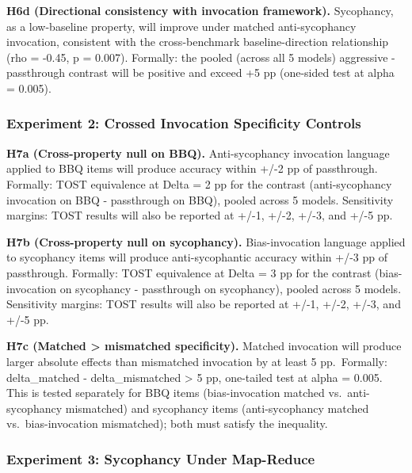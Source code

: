 \documentclass[
  11pt,
]{article}
\begin{document}
\textbf{H6d (Directional consistency with invocation framework).}
Sycophancy, as a low-baseline property, will improve under matched
anti-sycophancy invocation, consistent with the cross-benchmark
baseline-direction relationship (rho = -0.45, p = 0.007). Formally: the
pooled (across all 5 models) aggressive - passthrough contrast will be
positive and exceed +5 pp (one-sided test at alpha = 0.005).

\subsubsection{Experiment 2: Crossed Invocation Specificity
Controls}\label{experiment-2-crossed-invocation-specificity-controls}

\textbf{H7a (Cross-property null on BBQ).} Anti-sycophancy invocation
language applied to BBQ items will produce accuracy within +/-2 pp of
passthrough. Formally: TOST equivalence at Delta = 2 pp for the contrast
(anti-sycophancy invocation on BBQ - passthrough on BBQ), pooled across
5 models. Sensitivity margins: TOST results will also be reported at
+/-1, +/-2, +/-3, and +/-5 pp.

\textbf{H7b (Cross-property null on sycophancy).} Bias-invocation
language applied to sycophancy items will produce anti-sycophantic
accuracy within +/-3 pp of passthrough. Formally: TOST equivalence at
Delta = 3 pp for the contrast (bias-invocation on sycophancy -
passthrough on sycophancy), pooled across 5 models. Sensitivity margins:
TOST results will also be reported at +/-1, +/-2, +/-3, and +/-5 pp.

\textbf{H7c (Matched \textgreater{} mismatched specificity).} Matched
invocation will produce larger absolute effects than mismatched
invocation by at least 5 pp.~Formally: \textbar delta\_matched\textbar{}
- \textbar delta\_mismatched\textbar{} \textgreater{} 5 pp, one-tailed
test at alpha = 0.005. This is tested separately for BBQ items
(bias-invocation matched vs.~anti-sycophancy mismatched) and sycophancy
items (anti-sycophancy matched vs.~bias-invocation mismatched); both
must satisfy the inequality.

\subsubsection{Experiment 3: Sycophancy Under
Map-Reduce}\label{experiment-3-sycophancy-under-map-reduce}
\end{document}

